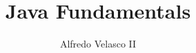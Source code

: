 \documentclass{book}
\title{Java Fundamentals}
\author{Alfredo Velasco II}
\begin{document}
\maketitle









\printglossaries
\end{document}
